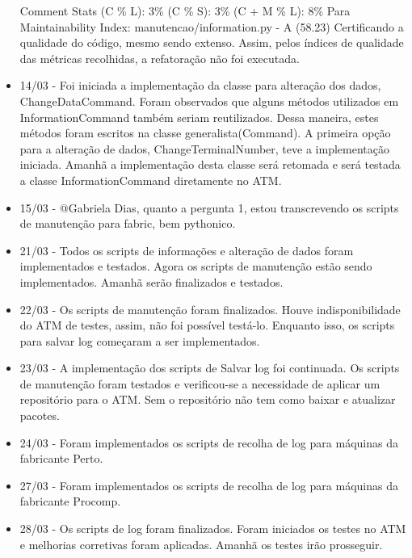 \begin{itemize}
  Comment Stats
  (C \% L): 3\%
  (C \% S): 3\%
  (C + M \% L): 8\%
  Para Maintainability Index: manutencao/information.py - A (58.23)
  Certificando a qualidade do código, mesmo sendo extenso. Assim, pelos índices de qualidade das métricas recolhidas, a refatoração não foi executada.


    \item 14/03 -
Foi iniciada a implementação da classe para alteração dos dados, ChangeDataCommand. Foram observados que alguns métodos utilizados em InformationCommand também seriam reutilizados. Dessa maneira, estes métodos foram escritos na classe generalista(Command). A primeira opção para a alteração de dados, ChangeTerminalNumber, teve a implementação iniciada. Amanhã a implementação desta classe será retomada e será testada a classe InformationCommand diretamente no ATM.


    \item 15/03 - @Gabriela Dias, quanto a pergunta 1, estou transcrevendo os scripts de manutenção para fabric, bem pythonico.


    \item 21/03 -
Todos os scripts de informações e alteração de dados foram implementados e testados.
Agora os scripts de manutenção estão sendo implementados. Amanhã serão finalizados e testados.


    \item 22/03 -
Os scripts de manutenção foram finalizados. Houve indisponibilidade do ATM de testes, assim, não foi possível testá-lo. Enquanto isso, os scripts para salvar log começaram a ser implementados.


    \item 23/03 -
A implementação dos scripts de Salvar log foi continuada. Os scripts de manutenção foram testados e verificou-se a necessidade de aplicar um repositório para o ATM. Sem o repositório não tem como baixar e atualizar pacotes.


    \item 24/03 -
Foram implementados os scripts de recolha de log para máquinas da fabricante Perto.


    \item 27/03 -
Foram implementados os scripts de recolha de log para máquinas da fabricante Procomp.


    \item 28/03 -
Os scripts de log foram finalizados. Foram iniciados os testes no ATM e melhorias corretivas foram aplicadas. Amanhã os testes irão prosseguir.



\end{itemize}
